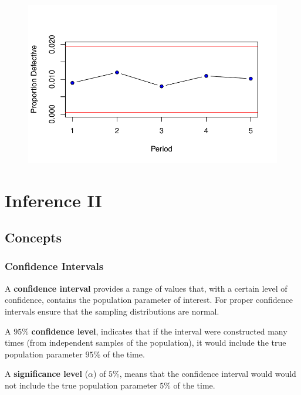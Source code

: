 \documentclass[
  letterpaper,
  DIV=11,
  numbers=noendperiod]{scrreprt}
\begin{document}
\begin{figure}[H]

{\centering \includegraphics{./12-InferenceI_files/figure-pdf/unnamed-chunk-22-1.pdf}

}

\end{figure}

\hypertarget{inference-ii}{%
\chapter{Inference II}\label{inference-ii}}

\hypertarget{concepts-11}{%
\section{Concepts}\label{concepts-11}}

\hypertarget{confidence-intervals}{%
\subsection*{Confidence Intervals}\label{confidence-intervals}}

A \textbf{confidence interval} provides a range of values that, with a
certain level of confidence, contains the population parameter of
interest. For proper confidence intervals ensure that the sampling
distributions are normal.

A \(95\)\% \textbf{confidence level}, indicates that if the interval
were constructed many times (from independent samples of the
population), it would include the true population parameter \(95\)\% of
the time.

A \textbf{significance level} (\(\alpha\)) of \(5\)\%, means that the
confidence interval would would not include the true population
parameter \(5\)\% of the time.
\end{document}
